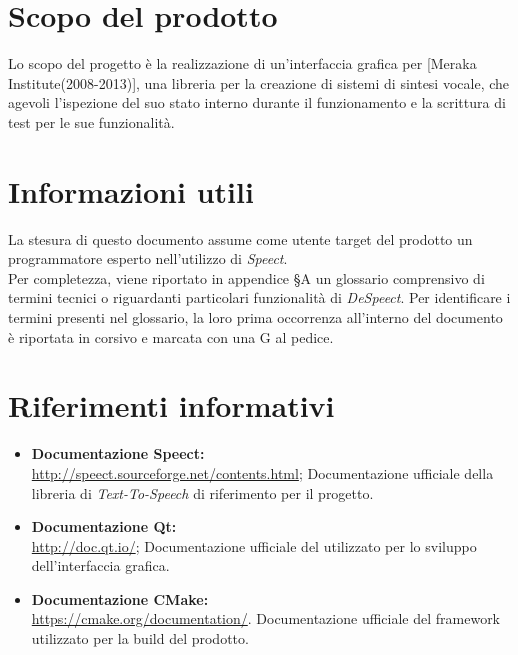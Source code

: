 \documentclass[openany,12pt,a4paper]{report}
\begin{document}
	\section{Scopo del prodotto}
	
	Lo scopo del progetto è la realizzazione di un’interfaccia grafica per  [Meraka Institute(2008-2013)], una libreria per la creazione di sistemi di sintesi vocale, che agevoli l’ispezione del suo stato interno durante il funzionamento e la scrittura di test per le sue funzionalità.
	
	\section{Informazioni utili}
	
	La stesura di questo documento assume come utente target del prodotto un programmatore esperto nell'utilizzo di \textit{Speect}. \\
	\noindent Per completezza, viene riportato in appendice §A un glossario comprensivo di termini tecnici o riguardanti particolari funzionalità di \textit{DeSpeect}. Per identificare i termini presenti nel glossario, la loro prima occorrenza all’interno del documento è riportata in corsivo e marcata con una G al pedice. 
	

	\newpage
	
	\section{Riferimenti informativi}

	\begin{itemize}
		\item \textbf{Documentazione Speect:} \\
		\url{http://speect.sourceforge.net/contents.html};
		\subitem Documentazione ufficiale della libreria di \textit{Text-To-Speech} di riferimento per il progetto.
		
		\item \textbf{Documentazione Qt:} \\
		\url{http://doc.qt.io/};
		\subitem Documentazione ufficiale del  utilizzato per lo sviluppo dell'interfaccia grafica.
		
		\item \textbf{Documentazione CMake:} \\
		\url{https://cmake.org/documentation/}.
		\subitem Documentazione ufficiale del framework utilizzato per la build del prodotto. 
	\end{itemize}
\end{document}
